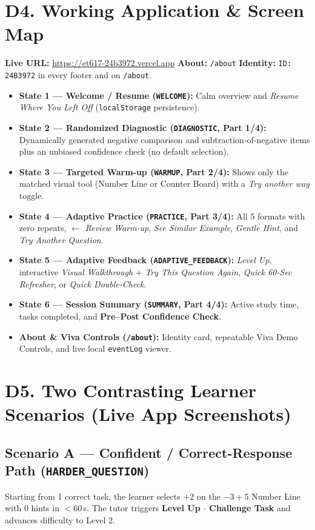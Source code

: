 \documentclass[10pt,a4paper]{article}
\begin{document}
\section*{D4. Working Application \& Screen Map}
\textbf{Live URL:} \url{https://et617-24b3972.vercel.app} \quad\textbullet\quad \textbf{About:} \texttt{/about} \quad\textbullet\quad \textbf{Identity:} \texttt{ID: 24B3972} in every footer and on \texttt{/about}.
\begin{itemize}
  \item \textbf{State 1 --- Welcome / Resume (\texttt{WELCOME}):} Calm overview and \emph{Resume Where You Left Off} (\texttt{localStorage} persistence).
  \item \textbf{State 2 --- Randomized Diagnostic (\texttt{DIAGNOSTIC}, Part 1/4):} Dynamically generated negative comparison and subtraction-of-negative items plus an unbiased confidence check (no default selection).
  \item \textbf{State 3 --- Targeted Warm-up (\texttt{WARMUP}, Part 2/4):} Shows only the matched visual tool (Number Line or Counter Board) with a \emph{Try another way} toggle.
  \item \textbf{State 4 --- Adaptive Practice (\texttt{PRACTICE}, Part 3/4):} All 5 formats with zero repeats, \emph{$\leftarrow$ Review Warm-up}, \emph{See Similar Example}, \emph{Gentle Hint}, and \emph{Try Another Question}.
  \item \textbf{State 5 --- Adaptive Feedback (\texttt{ADAPTIVE\_FEEDBACK}):} \emph{Level Up}, interactive \emph{Visual Walkthrough} + \emph{Try This Question Again}, \emph{Quick 60-Sec Refresher}, or \emph{Quick Double-Check}.
  \item \textbf{State 6 --- Session Summary (\texttt{SUMMARY}, Part 4/4):} Active study time, tasks completed, and \textbf{Pre--Post Confidence Check}.
  \item \textbf{About \& Viva Controls (\texttt{/about}):} Identity card, repeatable Viva Demo Controls, and live local \texttt{eventLog} viewer.
\end{itemize}

\newpage
\section*{D5. Two Contrasting Learner Scenarios (Live App Screenshots)}

\subsection*{Scenario A --- Confident / Correct-Response Path (\texttt{HARDER\_QUESTION})}
Starting from 1 correct task, the learner selects $+2$ on the $-3 + 5$ Number Line with $0$ hints in $<60$\,s. The tutor triggers \textbf{Level Up $\cdot$ Challenge Task} and advances difficulty to Level 2.
\end{document}
